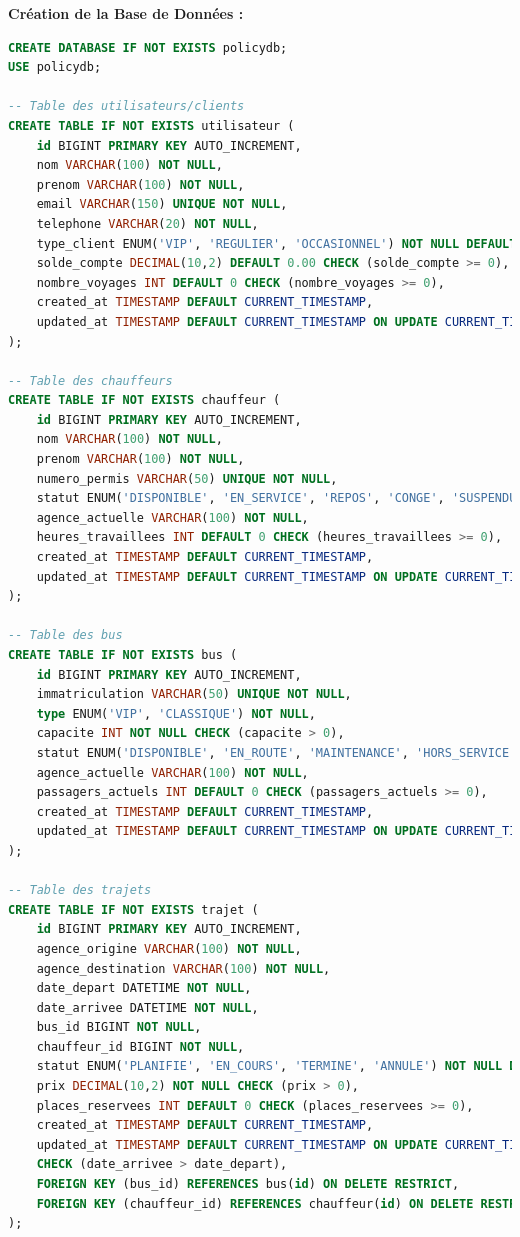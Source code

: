 \documentclass[12pt,a4paper]{article}
\begin{document}
    \begin{tcolorbox}[codebox]
        \textbf{Création de la Base de Données :}
        \begin{lstlisting}[language=SQL]
CREATE DATABASE IF NOT EXISTS policydb;
USE policydb;

-- Table des utilisateurs/clients
CREATE TABLE IF NOT EXISTS utilisateur (
    id BIGINT PRIMARY KEY AUTO_INCREMENT,
    nom VARCHAR(100) NOT NULL,
    prenom VARCHAR(100) NOT NULL,
    email VARCHAR(150) UNIQUE NOT NULL,
    telephone VARCHAR(20) NOT NULL,
    type_client ENUM('VIP', 'REGULIER', 'OCCASIONNEL') NOT NULL DEFAULT 'OCCASIONNEL',
    solde_compte DECIMAL(10,2) DEFAULT 0.00 CHECK (solde_compte >= 0),
    nombre_voyages INT DEFAULT 0 CHECK (nombre_voyages >= 0),
    created_at TIMESTAMP DEFAULT CURRENT_TIMESTAMP,
    updated_at TIMESTAMP DEFAULT CURRENT_TIMESTAMP ON UPDATE CURRENT_TIMESTAMP
);

-- Table des chauffeurs
CREATE TABLE IF NOT EXISTS chauffeur (
    id BIGINT PRIMARY KEY AUTO_INCREMENT,
    nom VARCHAR(100) NOT NULL,
    prenom VARCHAR(100) NOT NULL,
    numero_permis VARCHAR(50) UNIQUE NOT NULL,
    statut ENUM('DISPONIBLE', 'EN_SERVICE', 'REPOS', 'CONGE', 'SUSPENDU') NOT NULL DEFAULT 'DISPONIBLE',
    agence_actuelle VARCHAR(100) NOT NULL,
    heures_travaillees INT DEFAULT 0 CHECK (heures_travaillees >= 0),
    created_at TIMESTAMP DEFAULT CURRENT_TIMESTAMP,
    updated_at TIMESTAMP DEFAULT CURRENT_TIMESTAMP ON UPDATE CURRENT_TIMESTAMP
);

-- Table des bus
CREATE TABLE IF NOT EXISTS bus (
    id BIGINT PRIMARY KEY AUTO_INCREMENT,
    immatriculation VARCHAR(50) UNIQUE NOT NULL,
    type ENUM('VIP', 'CLASSIQUE') NOT NULL,
    capacite INT NOT NULL CHECK (capacite > 0),
    statut ENUM('DISPONIBLE', 'EN_ROUTE', 'MAINTENANCE', 'HORS_SERVICE') NOT NULL DEFAULT 'DISPONIBLE',
    agence_actuelle VARCHAR(100) NOT NULL,
    passagers_actuels INT DEFAULT 0 CHECK (passagers_actuels >= 0),
    created_at TIMESTAMP DEFAULT CURRENT_TIMESTAMP,
    updated_at TIMESTAMP DEFAULT CURRENT_TIMESTAMP ON UPDATE CURRENT_TIMESTAMP
);

-- Table des trajets
CREATE TABLE IF NOT EXISTS trajet (
    id BIGINT PRIMARY KEY AUTO_INCREMENT,
    agence_origine VARCHAR(100) NOT NULL,
    agence_destination VARCHAR(100) NOT NULL,
    date_depart DATETIME NOT NULL,
    date_arrivee DATETIME NOT NULL,
    bus_id BIGINT NOT NULL,
    chauffeur_id BIGINT NOT NULL,
    statut ENUM('PLANIFIE', 'EN_COURS', 'TERMINE', 'ANNULE') NOT NULL DEFAULT 'PLANIFIE',
    prix DECIMAL(10,2) NOT NULL CHECK (prix > 0),
    places_reservees INT DEFAULT 0 CHECK (places_reservees >= 0),
    created_at TIMESTAMP DEFAULT CURRENT_TIMESTAMP,
    updated_at TIMESTAMP DEFAULT CURRENT_TIMESTAMP ON UPDATE CURRENT_TIMESTAMP,
    CHECK (date_arrivee > date_depart),
    FOREIGN KEY (bus_id) REFERENCES bus(id) ON DELETE RESTRICT,
    FOREIGN KEY (chauffeur_id) REFERENCES chauffeur(id) ON DELETE RESTRICT
);


\end{lstlisting}
\end{tcolorbox}
\end{document}
